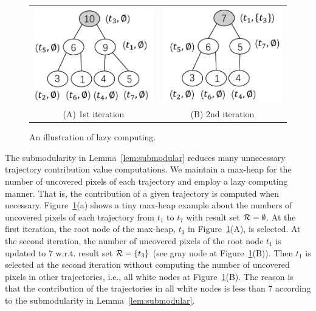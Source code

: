 \begin{figure}
 \centering
 \small
 \begin{tabular}{cc}
   \includegraphics[width=0.35\columnwidth]{pictures/1st}
   &
   \includegraphics[width=0.35\columnwidth]{pictures/2nd}
   \\
   (A) 1st iteration
   &
   (B) 2nd iteration
 \end{tabular}
 \vspace{-2mm}
 \caption{An illustration of lazy computing.} \label{fig:heap} %
 \vspace{-2mm}
\end{figure}


The submodularity in Lemma~\ref{lem:submodular} reduces many unnecessary trajectory contribution value computations.
We maintain a max-heap for the number of uncovered pixels of each trajectory and employ a lazy computing manner.
That is, the contribution of a given trajectory is computed when necessary.
Figure~\ref{fig:heap}(a) shows a tiny max-heap example about the numbers of uncovered pixels of each trajectory from $t_1$ to $t_7$ with result set $\mathcal{R}=\emptyset$.
At the first iteration, the root node of the max-heap, $t_3$ in Figure~\ref{fig:heap}(A), is selected.
At the second iteration, the number of uncovered pixels of the root node $t_1$ is updated to 7 w.r.t. result set $\mathcal{R} = \{t_3 \}$ (see gray node at Figure~\ref{fig:heap}(B)).
Then $t_1$ is selected at the second iteration without computing the number of uncovered pixels in other trajectories, i.e., all white nodes at Figure~\ref{fig:heap}(B).
The reason is that the contribution of the trajectories in all white nodes is less than 7 according to the submodularity in Lemma~\ref{lem:submodular}.

